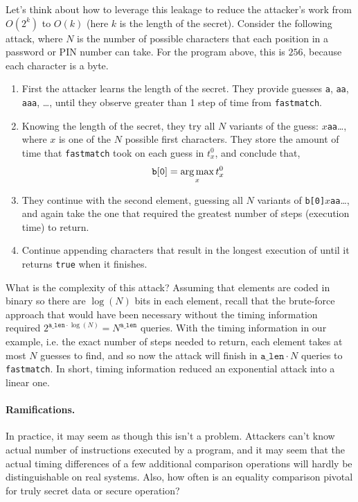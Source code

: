 \documentclass[11pt,twoside]{scrartcl}
\begin{document}
Let's think about how to leverage this leakage to reduce the attacker's work from $O(2^k)$ to $O(k)$ (here $k$ is the length of the secret).
Consider the following attack, where $N$ is the number of possible characters that each position in a password or PIN number can take.
For the program above, this is $256$, because each character is a byte.
\begin{enumerate}
  \item First the attacker learns the length of the secret. They provide guesses \verb'a', \verb'aa', \verb'aaa', \ldots, until they observe greater than 1 step of time from \verb'fastmatch'.
	
  \item Knowing the length of the secret, they try all $N$ variants of the guess: $x$\verb'aa'\ldots, where $x$ is one of the $N$ possible first characters. They store the amount of time that \verb'fastmatch' took on each guess in $t^0_x$, and conclude that,
  \[
  \mathtt{b[0]} = \operatorname*{arg\,max}_x t^0_x
  \]
	
  \item They continue with the second element, guessing all $N$ variants of \verb'b[0]'$x$\verb'aa'\ldots, and again take the one that required the greatest number of steps (execution time) to return.
	
  \item Continue appending characters that result in the longest execution of  until it returns \verb'true' when it finishes.
\end{enumerate}
What is the complexity of this attack? Assuming that elements are coded in binary so there are $\log(N)$ bits in each element, recall that the brute-force approach that would have been necessary without the timing information required $2^{\mathtt{a\_len}\cdot\log(N)} = N^\mathtt{a\_len}$ queries. 
With the timing information in our example, i.e. the exact number of steps needed to return, each element takes at most $N$ guesses to find, and so now the attack will finish in $\mathtt{a\_len}\cdot N$ queries to \texttt{fastmatch}. 
In short, timing information reduced an exponential attack into a linear one.

\paragraph{Ramifications.}
In practice, it may seem as though this isn't a problem. 
Attackers can't know actual number of instructions executed by a program, and it may seem that the actual timing differences of a few additional comparison operations will hardly be distinguishable on real systems.
Also, how often is an equality comparison pivotal for truly secret data or secure operation?
\end{document}
